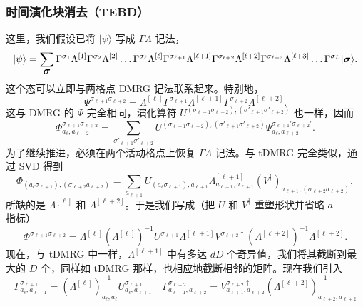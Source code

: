 \documentclass[a4paper,10pt,oneside,onecolumn,1p,times]{elsarticle}
\newcommand{\ket}[1]{\mbox{$| #1  \rangle$}}
\newcommand{\fat}[1]{\mbox{\boldmath$#1$\unboldmath}}	%
\begin{document}
\subsubsection{时间演化块消去（TEBD）}
这里，我们假设已将 $\ket{\psi}$ 写成 $\Gamma\Lambda$ 记法，
\begin{equation}
\ket{\psi} = \sum_{\fat{\sigma}} 
\Gamma^{\sigma_1} \Lambda^{[1]} \Gamma^{\sigma_2} \Lambda^{[2]} \ldots
\Gamma^{\sigma_{\ell}} \Lambda^{[\ell]}  \Gamma^{\sigma_{\ell+1}} \Lambda^{[\ell+1]}
\Gamma^{\sigma_{\ell+2}} \Lambda^{[\ell+2]}  \Gamma^{\sigma_{\ell+3}} \Lambda^{[\ell+3]} \ldots
\Gamma^{\sigma_L}   
\ket{\fat{\sigma}}.
\label{eq:TEBDstart}
\end{equation}
这个态可以立即与两格点 DMRG 记法联系起来。特别地，
\begin{equation}
\Psi^{\sigma_{\ell+1} \sigma_{\ell+2}} = \Lambda^{[\ell]}  \Gamma^{\sigma_{\ell+1}} \Lambda^{[\ell+1]}
\Gamma^{\sigma_{\ell+2}} \Lambda^{[\ell+2]}  .
\end{equation}
这与 DMRG 的 $\Psi$ 完全相同，演化算符 $U^{(\sigma_{\ell+1} \sigma_{\ell+2}), (\sigma'_{\ell+1} \sigma'_{\ell+2})}$ 也一样，因而  
\begin{equation}
\Phi^{\sigma_{\ell+1}\sigma_{\ell+2}}_{a_\ell, a_{\ell+2}} = \sum_{\sigma'_{\ell+1} \sigma'_{\ell+2}}
U^{(\sigma_{\ell+1} \sigma_{\ell+2}), (\sigma'_{\ell+1} \sigma'_{\ell+2})}  \Psi^{\sigma_{\ell+1}'\sigma_{\ell+2}'}_{a_\ell, a_{\ell+2}} . 
\end{equation} 
为了继续推进，必须在两个活动格点上恢复 $\Gamma\Lambda$ 记法。与 tDMRG 完全类似，通过 SVD 得到
\begin{equation}
\Phi_{(a_\ell \sigma_{\ell+1}), (\sigma_{\ell+2} a_{\ell+2})} = \sum_{a_{\ell+1}} U_{(a_\ell \sigma_{\ell+1}),a_{\ell+1}} \Lambda^{[\ell+1]}_{a_{\ell+1},a_{\ell+1}} (V^\dagger)_{a_{\ell+1}, (\sigma_{\ell+2} a_{\ell+2})} ,
\end{equation}
所缺的是 $\Lambda^{[\ell]}$ 和 $\Lambda^{[\ell+2]}$。于是我们写成（把 $U$ 和 $V^\dagger$ 重塑形状并省略 $a$ 指标）
\begin{equation}
\Phi^{\sigma_{\ell+1}\sigma_{\ell+2}} = \Lambda^{[\ell]} (\Lambda^{[\ell]})^{-1} U^{\sigma_{\ell+1}} 
 \Lambda^{[\ell+1]} V^{\sigma_{\ell+2}\dagger} ( \Lambda^{[\ell+2]})^{-1}  \Lambda^{[\ell+2]} .
\end{equation}
现在，与 tDMRG 中一样，$ \Lambda^{[\ell+1]}$ 中有多达 $dD$ 个奇异值，我们将其截断到最大的 $D$ 个，同样如 tDMRG 那样，也相应地截断相邻的矩阵。现在我们引入
\begin{equation}
\Gamma^{\sigma_{\ell+1}}_{a_\ell,a_{\ell+1}} =  (\Lambda^{[\ell]})^{-1}_{a_\ell,a_\ell} U^{\sigma_{\ell+1}}_{a_\ell,a_{\ell+1}} \quad 
\Gamma^{\sigma_{\ell+2}}_{a_{\ell+1},a_{\ell+2}} =  V^{\sigma_{\ell+2}\dagger}_{a_{\ell+1},a_{\ell+2}} ( \Lambda^{[\ell+2]})^{-1}_{a_{\ell+2},a_{\ell+2}} 
\end{equation}
\end{document}
